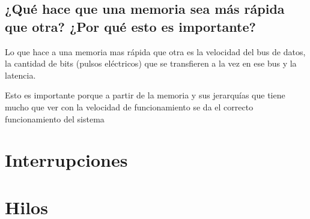 \documentclass{article}
\begin{document}
\subsection{¿Qué hace que una memoria sea más rápida que otra?
¿Por qué esto es importante?}

\vspace{0.5cm}
\noindent
Lo que hace a una memoria mas rápida que otra es la velocidad del bus de datos, la cantidad de bits (pulsos eléctricos) que se transfieren a la vez en ese bus y la latencia.

\vspace{0.5cm}
\noindent
Esto es importante porque a partir de la memoria y sus jerarquías que tiene mucho que ver con la velocidad de funcionamiento se da el correcto funcionamiento del sistema

\newpage
\section{Interrupciones} 
\newpage
\section{Hilos} 
\newpage


\end{document}

